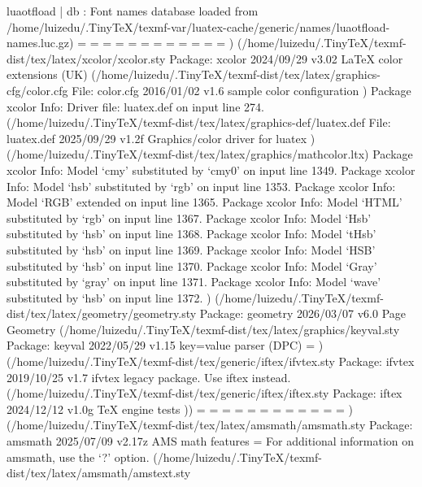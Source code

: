 luaotfload | db : Font names database loaded from /home/luizedu/.TinyTeX/texmf-var/luatex-cache/generic/names/luaotfload-names.luc.gz)
\c@part=
\c@chapter=
\c@section=
\c@subsection=
\c@subsubsection=
\c@paragraph=
\c@subparagraph=
\c@figure=
\c@table=
\abovecaptionskip=
\belowcaptionskip=
\bibindent=
) (/home/luizedu/.TinyTeX/texmf-dist/tex/latex/xcolor/xcolor.sty
Package: xcolor 2024/09/29 v3.02 LaTeX color extensions (UK)
(/home/luizedu/.TinyTeX/texmf-dist/tex/latex/graphics-cfg/color.cfg
File: color.cfg 2016/01/02 v1.6 sample color configuration
)
Package xcolor Info: Driver file: luatex.def on input line 274.
(/home/luizedu/.TinyTeX/texmf-dist/tex/latex/graphics-def/luatex.def
File: luatex.def 2025/09/29 v1.2f Graphics/color driver for luatex
) (/home/luizedu/.TinyTeX/texmf-dist/tex/latex/graphics/mathcolor.ltx)
Package xcolor Info: Model `cmy' substituted by `cmy0' on input line 1349.
Package xcolor Info: Model `hsb' substituted by `rgb' on input line 1353.
Package xcolor Info: Model `RGB' extended on input line 1365.
Package xcolor Info: Model `HTML' substituted by `rgb' on input line 1367.
Package xcolor Info: Model `Hsb' substituted by `hsb' on input line 1368.
Package xcolor Info: Model `tHsb' substituted by `hsb' on input line 1369.
Package xcolor Info: Model `HSB' substituted by `hsb' on input line 1370.
Package xcolor Info: Model `Gray' substituted by `gray' on input line 1371.
Package xcolor Info: Model `wave' substituted by `hsb' on input line 1372.
) (/home/luizedu/.TinyTeX/texmf-dist/tex/latex/geometry/geometry.sty
Package: geometry 2026/03/07 v6.0 Page Geometry
(/home/luizedu/.TinyTeX/texmf-dist/tex/latex/graphics/keyval.sty
Package: keyval 2022/05/29 v1.15 key=value parser (DPC)
\KV@toks@=
) (/home/luizedu/.TinyTeX/texmf-dist/tex/generic/iftex/ifvtex.sty
Package: ifvtex 2019/10/25 v1.7 ifvtex legacy package. Use iftex instead.
(/home/luizedu/.TinyTeX/texmf-dist/tex/generic/iftex/iftex.sty
Package: iftex 2024/12/12 v1.0g TeX engine tests
))
\Gm@cnth=
\Gm@cntv=
\c@Gm@tempcnt=
\Gm@bindingoffset=
\Gm@wd@mp=
\Gm@odd@mp=
\Gm@even@mp=
\Gm@layoutwidth=
\Gm@layoutheight=
\Gm@layouthoffset=
\Gm@layoutvoffset=
\Gm@dimlist=
) (/home/luizedu/.TinyTeX/texmf-dist/tex/latex/amsmath/amsmath.sty
Package: amsmath 2025/07/09 v2.17z AMS math features
\@mathmargin=
For additional information on amsmath, use the `?' option.
(/home/luizedu/.TinyTeX/texmf-dist/tex/latex/amsmath/amstext.sty
